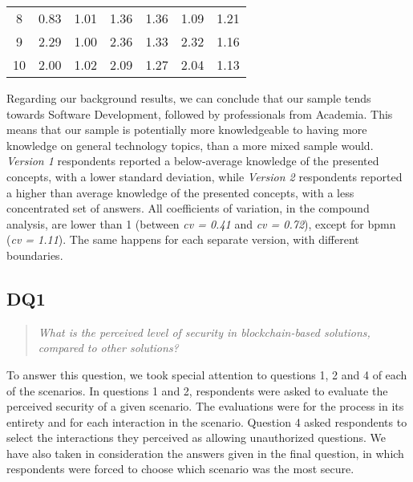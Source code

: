 \begin{table}[htb]
\begin{tabular}{c|cccc|cc}
		8           & 0.83                              & 1.01                                     & 1.36                         & 1.36         & 1.09        & 1.21         \\
		9           & 2.29                              & 1.00                                     & 2.36                         & 1.33         & 2.32        & 1.16         \\
		10          & 2.00                              & 1.02                                     & 2.09                         & 1.27         & 2.04        & 1.13         \\
		\hline
	\end{tabular}
\end{table}

Regarding our background results, we can conclude that our sample tends towards Software Development, followed by professionals from Academia. This means that our sample is potentially more knowledgeable to having more knowledge on general technology topics, than a more mixed sample would. \textit{Version 1} respondents reported a below-average knowledge of the presented concepts, with a lower standard deviation, while \textit{Version 2} respondents reported a higher than average knowledge of the presented concepts, with a less concentrated set of answers. All coefficients of variation, in the compound analysis, are lower than 1 (between \textit{cv = 0.41} and \textit{cv = 0.72}), except for \gls{bpmn} (\textit{cv = 1.11}). The same happens for each separate version, with different boundaries.

\subsection{DQ1}

\begin{quote}
	\textit{What is the perceived level of security in blockchain-based solutions, compared to other solutions?}
\end{quote}

To answer this question, we took special attention to questions 1, 2 and 4 of each of the scenarios. In questions 1 and 2, respondents were asked to evaluate the perceived security of a given scenario. The evaluations were for the process in its entirety and for each interaction in the scenario. Question 4 asked respondents to select the interactions they perceived as allowing unauthorized questions. We have also taken in consideration the answers given in the final question, in which respondents were forced to choose which scenario was the most secure.

